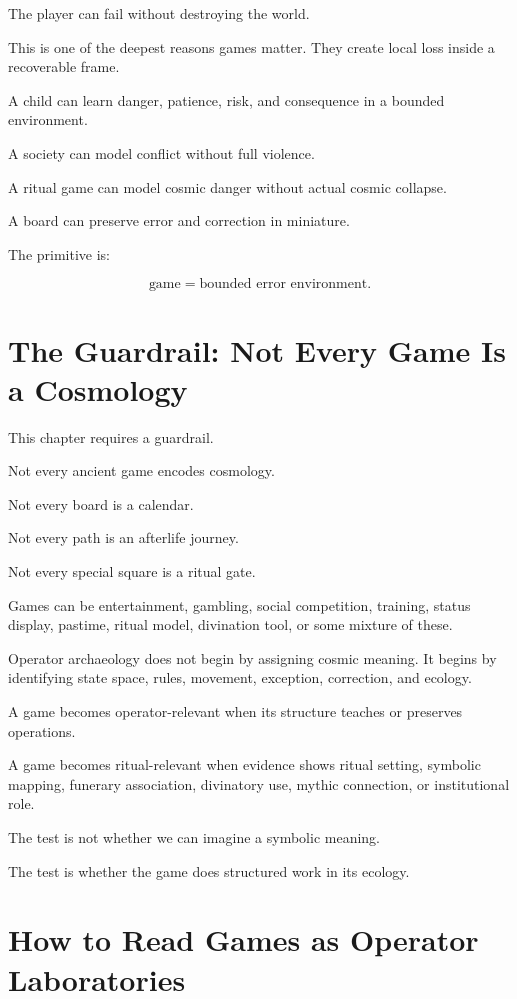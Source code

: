 \documentclass[11pt]{book}
\begin{document}
The player can fail without destroying the world.

This is one of the deepest reasons games matter. They create local loss inside a recoverable frame.

A child can learn danger, patience, risk, and consequence in a bounded environment.

A society can model conflict without full violence.

A ritual game can model cosmic danger without actual cosmic collapse.

A board can preserve error and correction in miniature.

The primitive is:

\[
\text{game} = \text{bounded error environment}.
\]

\section{The Guardrail: Not Every Game Is a Cosmology}

This chapter requires a guardrail.

Not every ancient game encodes cosmology.

Not every board is a calendar.

Not every path is an afterlife journey.

Not every special square is a ritual gate.

Games can be entertainment, gambling, social competition, training, status display, pastime, ritual model, divination tool, or some mixture of these.

Operator archaeology does not begin by assigning cosmic meaning. It begins by identifying state space, rules, movement, exception, correction, and ecology.

A game becomes operator-relevant when its structure teaches or preserves operations.

A game becomes ritual-relevant when evidence shows ritual setting, symbolic mapping, funerary association, divinatory use, mythic connection, or institutional role.

The test is not whether we can imagine a symbolic meaning.

The test is whether the game does structured work in its ecology.

\section{How to Read Games as Operator Laboratories}
\end{document}
